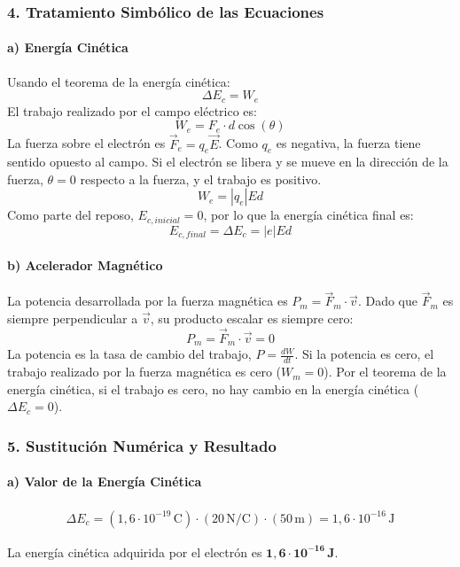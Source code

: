 \subsubsection*{4. Tratamiento Simbólico de las Ecuaciones}
\paragraph*{a) Energía Cinética}
Usando el teorema de la energía cinética:
$$\Delta E_c = W_e$$
El trabajo realizado por el campo eléctrico es:
$$W_e = F_e \cdot d \cos(\theta)$$
La fuerza sobre el electrón es $\vec{F}_e = q_e \vec{E}$. Como $q_e$ es negativa, la fuerza tiene sentido opuesto al campo. Si el electrón se libera y se mueve en la dirección de la fuerza, $\theta = 0$ respecto a la fuerza, y el trabajo es positivo.
$$W_e = |q_e| E d$$
Como parte del reposo, $E_{c, inicial} = 0$, por lo que la energía cinética final es:
$$E_{c, final} = \Delta E_c = |e| E d$$

\paragraph*{b) Acelerador Magnético}
La potencia desarrollada por la fuerza magnética es $P_m = \vec{F}_m \cdot \vec{v}$. Dado que $\vec{F}_m$ es siempre perpendicular a $\vec{v}$, su producto escalar es siempre cero:
$$P_m = \vec{F}_m \cdot \vec{v} = 0$$
La potencia es la tasa de cambio del trabajo, $P = \frac{dW}{dt}$. Si la potencia es cero, el trabajo realizado por la fuerza magnética es cero ($W_m=0$). Por el teorema de la energía cinética, si el trabajo es cero, no hay cambio en la energía cinética ($\Delta E_c = 0$).

\subsubsection*{5. Sustitución Numérica y Resultado}
\paragraph*{a) Valor de la Energía Cinética}
\begin{gather}
    \Delta E_c = (1,6 \cdot 10^{-19} \, \text{C}) \cdot (20 \, \text{N/C}) \cdot (50 \, \text{m}) = 1,6 \cdot 10^{-16} \, \text{J}
\end{gather}
\begin{cajaresultado}
    La energía cinética adquirida por el electrón es $\boldsymbol{1,6 \cdot 10^{-16} \, \textbf{J}}$.
\end{cajaresultado}

